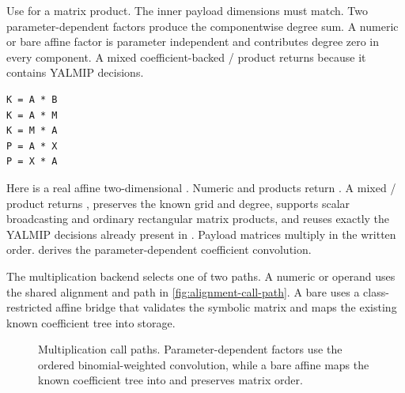 Use  for a matrix product. The inner payload dimensions must match. Two parameter-dependent factors produce the componentwise degree sum. A numeric or bare affine  factor is parameter independent and contributes degree zero in every component. A mixed coefficient-backed / product returns  because it contains YALMIP decisions.

\syntaxhead
\begin{lstlisting}[style=dpsyntax]
K = A * B
K = A * M
K = M * A
P = A * X
P = X * A
\end{lstlisting}

Here  is a real affine two-dimensional . Numeric and  products return . A mixed / product returns , preserves the known grid and degree, supports scalar broadcasting and ordinary rectangular matrix products, and reuses exactly the YALMIP decisions already present in . Payload matrices multiply in the written order.  derives the parameter-dependent coefficient convolution.

The multiplication backend selects one of two paths. A numeric or  operand uses the shared alignment and  path in \cref{fig:alignment-call-path}. A bare  uses a class-restricted affine bridge that validates the symbolic matrix and maps the existing known coefficient tree into  storage.

\begin{figure}[H]
\centering
{}
\caption{Multiplication call paths. Parameter-dependent factors use the ordered binomial-weighted convolution, while a bare affine  maps the known coefficient tree into  and preserves matrix order.}
\label{fig:multiplication-call-path}
\end{figure}

